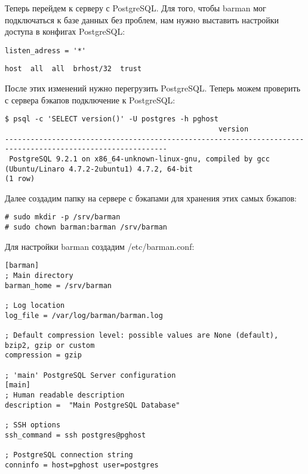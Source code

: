 Теперь перейдем к серверу с PostgreSQL. Для того, чтобы barman мог подключаться к базе данных без проблем, нам нужно выставить настройки доступа в конфигах PostgreSQL:

\begin{lstlisting}[label=lst:barman4,caption=Отредактировать в postgresql.conf]
listen_adress = '*'
\end{lstlisting}

\begin{lstlisting}[label=lst:barman5,caption=Добавить в pg\_hba.conf]
host  all  all  brhost/32  trust
\end{lstlisting}

После этих изменений нужно перегрузить PostgreSQL. Теперь можем проверить с сервера бэкапов подключение к PostgreSQL:

\begin{lstlisting}[label=lst:barman6,caption=Проверка подключения к базе]
$ psql -c 'SELECT version()' -U postgres -h pghost
                                                  version
------------------------------------------------------------------------------------------------------------
 PostgreSQL 9.2.1 on x86_64-unknown-linux-gnu, compiled by gcc (Ubuntu/Linaro 4.7.2-2ubuntu1) 4.7.2, 64-bit
(1 row)
\end{lstlisting}

Далее создадим папку на сервере с бэкапами для хранения этих самых бэкапов:

\begin{lstlisting}[label=lst:barman7,caption=Папка для хранения бэкапов]
# sudo mkdir -p /srv/barman
# sudo chown barman:barman /srv/barman
\end{lstlisting}

Для настройки barman создадим /etc/barman.conf:

\begin{lstlisting}[label=lst:barman8,caption=barman.conf]
[barman]
; Main directory
barman_home = /srv/barman

; Log location
log_file = /var/log/barman/barman.log

; Default compression level: possible values are None (default), bzip2, gzip or custom
compression = gzip

; 'main' PostgreSQL Server configuration
[main]
; Human readable description
description =  "Main PostgreSQL Database"

; SSH options
ssh_command = ssh postgres@pghost

; PostgreSQL connection string
conninfo = host=pghost user=postgres
\end{lstlisting}

